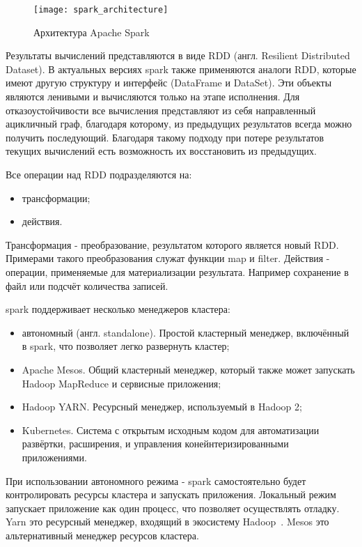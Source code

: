 \begin{figure}
    \centering
    \texttt{[image: spark\_architecture]}
    \caption{Архитектура Apache Spark~\cite{spark_architecture_overview}}
    \label{pic:lit_review:spark_architecture}
\end{figure}

Результаты вычислений представляются в виде RDD (англ. Resilient Distributed Dataset). 
В актуальных версиях spark также применяются аналоги RDD, которые имеют другую структуру и интерфейс (DataFrame и DataSet).
Эти объекты являются ленивыми и вычисляются только на этапе исполнения.
Для отказоустойчивости все вычисления представляют из себя направленный ацикличный граф, благодаря которому, из предыдущих результатов всегда можно получить последующий.
Благодаря такому подходу при потере результатов текущих вычислений есть возможность их восстановить из предыдущих.

Все операции над RDD подразделяются на:
\begin{itemize}
    \item трансформации;
    \item действия.
\end{itemize}

Трансформация - преобразование, результатом которого является новый RDD. 
Примерами такого преобразования служат функции map и filter.
Действия - операции, применяемые для материализации результата.
Например сохранение в файл или подсчёт количества записей.

spark поддерживает несколько менеджеров кластера:
\begin{itemize}
    \item автономный (англ. standalone). Простой кластерный менеджер, включённый в spark, что позволяет легко развернуть кластер;
    \item Apache Mesos. Общий кластерный менеджер, который также может запускать Hadoop MapReduce и сервисные приложения;
    \item Hadoop YARN. Ресурсный менеджер, используемый в Hadoop 2;
    \item Kubernetes. Система с открытым исходным кодом для автоматизации развёртки, расширения, и управления конейнтеризированными приложениями.
\end{itemize}

При использовании автономного режима - spark самостоятельно будет контролировать ресурсы кластера и запускать приложения.
Локальный режим запускает приложение как один процесс, что позволяет осуществлять отладку.
Yarn это ресурсный менеджер, входящий в экосистему Hadoop~\cite{hadoop_difinitive_guide}.
Mesos это альтернативный менеджер ресурсов кластера.

